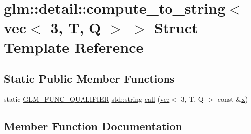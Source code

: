 \hypertarget{structglm_1_1detail_1_1compute__to__string_3_01vec_3_013_00_01_t_00_01_q_01_4_01_4}{}\section{glm\+:\+:detail\+:\+:compute\+\_\+to\+\_\+string$<$ vec$<$ 3, T, Q $>$ $>$ Struct Template Reference}
\label{structglm_1_1detail_1_1compute__to__string_3_01vec_3_013_00_01_t_00_01_q_01_4_01_4}
\subsection*{Static Public Member Functions}
\begin{DoxyCompactItemize}
\item 
static \mbox{\hyperlink{setup_8hpp_a33fdea6f91c5f834105f7415e2a64407}{G\+L\+M\+\_\+\+F\+U\+N\+C\+\_\+\+Q\+U\+A\+L\+I\+F\+I\+ER}} \mbox{\hyperlink{_s_d_l__opengl__glext_8h_ae84541b4f3d8e1ea24ec0f466a8c568b}{std\+::string}} \mbox{\hyperlink{structglm_1_1detail_1_1compute__to__string_3_01vec_3_013_00_01_t_00_01_q_01_4_01_4_a61d57060d3b0c3f2dd672f7b8cf962a5}{call}} (\mbox{\hyperlink{structglm_1_1vec}{vec}}$<$ 3, T, Q $>$ const \&\mbox{\hyperlink{_s_d_l__opengl_8h_ad0e63d0edcdbd3d79554076bf309fd47}{x}})
\end{DoxyCompactItemize}


\subsection{Member Function Documentation}
\mbox{\label{structglm_1_1detail_1_1compute__to__string_3_01vec_3_013_00_01_t_00_01_q_01_4_01_4_a61d57060d3b0c3f2dd672f7b8cf962a5}} 
